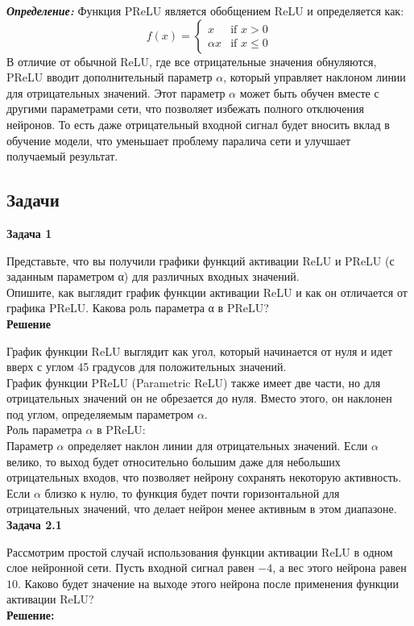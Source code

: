 \textbf{\textit{Определение:}}
Функция PReLU является обобщением ReLU и определяется как:
$$ f(x) = \begin{cases}
x & \text{if } x > 0 \\
\alpha x & \text{if } x \leq 0
\end{cases} $$
В отличие от обычной ReLU, где все отрицательные значения обнуляются, PReLU вводит дополнительный параметр $\alpha$, который управляет наклоном линии для отрицательных значений. Этот параметр $\alpha$ может быть обучен вместе с другими параметрами сети, что позволяет избежать полного отключения нейронов. То есть даже отрицательный входной сигнал будет вносить вклад в обучение модели, что уменьшает проблему паралича сети и улучшает получаемый результат.

\subsection{Задачи}
\textbf{Задача 1}

Представьте, что вы получили графики функций активации ReLU и PReLU (с заданным параметром α) для различных входных значений.\\
Опишите, как выглядит график функции активации ReLU и как он отличается от графика PReLU. Какова роль параметра α в PReLU?\\
\textbf{Решение}

График функции ReLU выглядит как угол, который начинается от нуля и идет вверх с углом 45 градусов для положительных значений.\\
График функции PReLU (Parametric ReLU) также имеет две части, но для отрицательных значений он не обрезается до нуля. Вместо этого, он наклонен под углом, определяемым параметром $\alpha$. \\
Роль параметра $\alpha$ в PReLU:\\
Параметр $\alpha$ определяет наклон линии для отрицательных значений. Если $\alpha$ велико, то выход будет относительно большим даже для небольших отрицательных входов, что позволяет нейрону сохранять некоторую активность. Если $\alpha$ близко к нулю, то функция будет почти горизонтальной для отрицательных значений, что делает нейрон менее активным в этом диапазоне.\\
\textbf{Задача 2.1}

Рассмотрим простой случай использования функции активации ReLU в одном слое нейронной сети. Пусть входной сигнал равен $-4$, а вес этого нейрона равен $10$. Каково будет значение на выходе этого нейрона после применения функции активации ReLU?\\
\textbf{Решение:}

